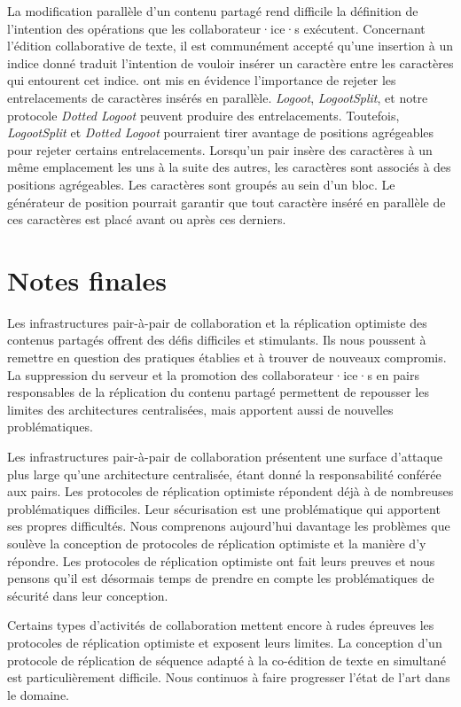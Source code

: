 La modification parallèle d'un contenu partagé rend difficile la définition de l'intention des opérations que les collaborateur·ice·s exécutent.
Concernant l'édition collaborative de texte, il est communément accepté qu'une insertion à un indice donné traduit l'intention de vouloir insérer un caractère entre les caractères qui entourent cet indice.
\textcite{kleppmann2019_interleaving} ont mis en évidence l'importance de rejeter les entrelacements de caractères insérés en parallèle.
\emph{Logoot}, \emph{LogootSplit}, et notre protocole \emph{Dotted Logoot} peuvent produire des entrelacements.
Toutefois, \emph{LogootSplit} et \emph{Dotted Logoot} pourraient tirer avantage de positions agrégeables pour rejeter certains entrelacements.
Lorsqu'un pair insère des caractères à un même emplacement les uns à la suite des autres, les caractères sont associés à des positions agrégeables.
Les caractères sont groupés au sein d'un bloc.
Le générateur de position pourrait garantir que tout caractère inséré en parallèle de ces caractères est placé avant ou après ces derniers.


\section{Notes finales}

Les infrastructures pair-à-pair de collaboration et la réplication optimiste des contenus partagés offrent des défis difficiles et stimulants.
Ils nous poussent à remettre en question des pratiques établies et à trouver de nouveaux compromis.
La suppression du serveur et la promotion des collaborateur·ice·s en pairs responsables de la réplication du contenu partagé permettent de repousser les limites des architectures centralisées, mais apportent aussi de nouvelles problématiques.

Les infrastructures pair-à-pair de collaboration présentent une surface d'attaque plus large qu'une architecture centralisée, étant donné la responsabilité conférée aux pairs.
Les protocoles de réplication optimiste répondent déjà à de nombreuses problématiques difficiles.
Leur sécurisation est une problématique qui apportent ses propres difficultés.
Nous comprenons aujourd'hui davantage les problèmes que soulève la conception de protocoles de réplication optimiste et la manière d'y répondre.
Les protocoles de réplication optimiste ont fait leurs preuves et nous pensons qu'il est désormais temps de prendre en compte les problématiques de sécurité dans leur conception.

Certains types d'activités de collaboration mettent encore à rudes épreuves les protocoles de réplication optimiste et exposent leurs limites.
La conception d'un protocole de réplication de séquence adapté à la co-édition de texte en simultané est particulièrement difficile.
Nous continuos à faire progresser l'état de l'art dans le domaine.

